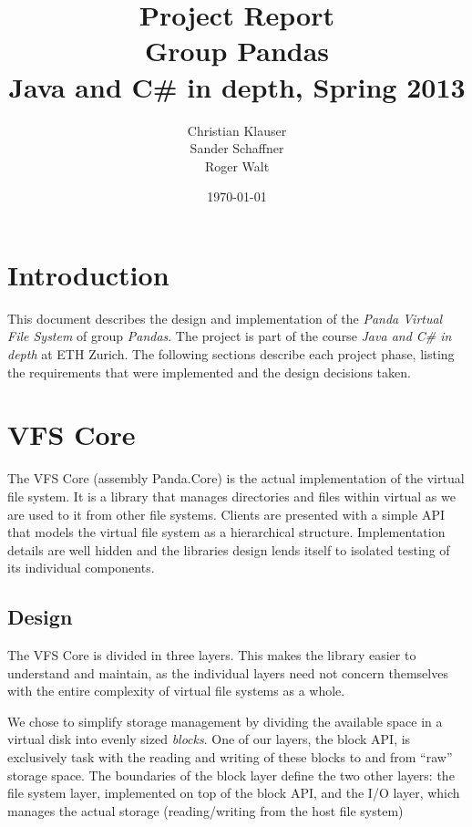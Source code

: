 \documentclass[a4paper,12pt]{article}
\title{
Project Report \\ 
Group Pandas \\
\vspace{5mm}
\large Java and C\# in depth, Spring 2013
}
\author{
Christian Klauser \\
Sander Schaffner \\
Roger Walt
}
\date{\today}
\begin{document}
\maketitle

\section{Introduction}

This document describes the design and implementation of the \emph{Panda Virtual File System} of group \emph{Pandas}. The project is part of the course \emph{Java and C\# in depth} at ETH Zurich. The following sections describe each project phase, listing the requirements that were implemented and the design decisions taken. 


\section{VFS Core}

The VFS Core (assembly Panda.Core) is the actual implementation of the virtual file system. It is a library that manages directories and files within virtual as we are used to it from other file systems. Clients are presented with a simple API that models the virtual file system as a hierarchical structure. Implementation details are well hidden and the libraries design lends itself to isolated testing of its individual components.

\subsection{Design}


The VFS Core is divided in three layers. 
This makes the library easier to understand and maintain, as the individual layers need not concern themselves with the entire complexity of virtual file systems as a whole.

We chose to simplify storage management by dividing the available space in a virtual disk into evenly sized \emph{blocks}. 
One of our layers, the block API, is exclusively task with the reading and writing of these blocks to and from ``raw'' storage space. 
The boundaries of the block layer define the two other layers: the file system layer, implemented on top of the block API, and the I/O layer, which manages the actual storage (reading/writing from the host file system)
\end{document}
